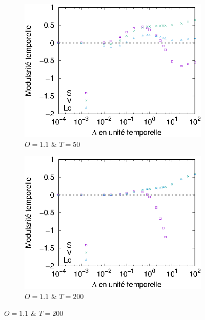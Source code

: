 \begin{figure}[h]
\centering
	\begin{subfigure}{0.35\textwidth}
		\includegraphics[width=\textwidth]{img/Qualite/Fonc/comp_1_T_50_O_1_1_Q_1.eps}
		\caption{$O=1.1$ \& $T=50$}
		\label{fig:versqualite_fonc_test1}
	\end{subfigure}
	\begin{subfigure}{0.35\textwidth}
		\includegraphics[width=\textwidth]{img/Qualite/Fonc/comp_0_1_T_200_O_1_1_Q_1.eps}
		\caption{$O=1.1$ \& $T=200$}
		\label{fig:versqualite_fonc_test2}
	\end{subfigure}
	

\end{figure}
